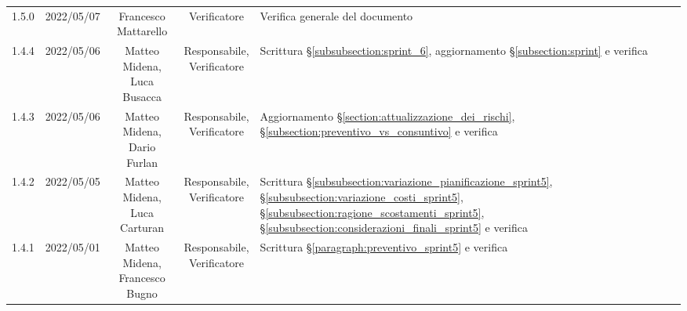 \begin{center}
\begin{longtable}[c]{c | c | c | c | p{5cm}}
		1.5.0                                                      & 2022/05/07 & Francesco Mattarello                   & Verificatore   & Verifica generale del documento                                                                                                           \\
		1.4.4                                                      & 2022/05/06 & \Shortunderstack{Matteo Midena,                                                                                                                                                                     \\Luca Busacca} & \Shortunderstack{Responsabile,\\Verificatore} & Scrittura §\ref{subsubsection:sprint_6}, aggiornamento §\ref{subsection:sprint} e verifica\\
		1.4.3                                                      & 2022/05/06 & \Shortunderstack{Matteo Midena,                                                                                                                                                                     \\Dario Furlan} & \Shortunderstack{Responsabile,\\Verificatore} & Aggiornamento §\ref{section:attualizzazione_dei_rischi}, §\ref{subsection:preventivo_vs_consuntivo} e verifica\\
		1.4.2                                                      & 2022/05/05 & \Shortunderstack{Matteo Midena,                                                                                                                                                                     \\Luca Carturan} & \Shortunderstack{Responsabile,\\Verificatore} & Scrittura §\ref{subsubsection:variazione_pianificazione_sprint5}, §\ref{subsubsection:variazione_costi_sprint5}, §\ref{subsubsection:ragione_scostamenti_sprint5}, §\ref{subsubsection:considerazioni_finali_sprint5} e verifica\\
		1.4.1                                                      & 2022/05/01 & \Shortunderstack{Matteo Midena,                                                                                                                                                                     \\Francesco Bugno} & \Shortunderstack{Responsabile,\\Verificatore} & Scrittura §\ref{paragraph:preventivo_sprint5} e verifica\\

\end{longtable}
\end{center}
